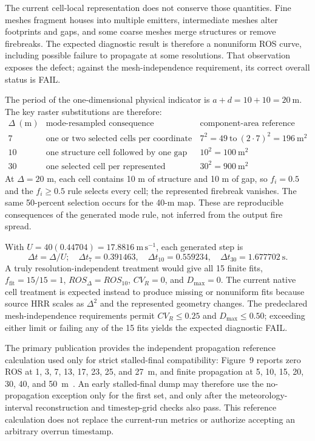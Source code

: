 The current cell-local representation does not conserve those quantities. Fine
meshes fragment houses into multiple emitters, intermediate meshes alter
footprints and gaps, and some coarse meshes merge structures or remove
firebreaks. The expected diagnostic result is therefore a nonuniform ROS curve,
including possible failure to propagate at some resolutions. That observation
exposes the defect; against the mesh-independence requirement, its correct
overall status is FAIL.

The period of the one-dimensional physical indicator is
\(a+d=10+10=20~\mathrm{m}\).  The key raster substitutions are therefore:
\[
\begin{array}{c|c|c}
\Delta~(\mathrm{m})&\text{mode-resampled consequence}&
\text{component-area reference}\\\hline
7&\text{one or two selected cells per coordinate}&
7^2=49\ \text{to}\ (2\cdot7)^2=196~\mathrm{m^2}\\
10&\text{one structure cell followed by one gap cell}&
10^2=100~\mathrm{m^2}\\
30&\text{one selected cell per represented structure}&
30^2=900~\mathrm{m^2}
\end{array}
\]
At \(\Delta=20\) m, each cell contains 10 m of structure and 10 m of gap, so
\(f_i=0.5\) and the \(f_i\geq0.5\) rule selects every cell; the represented
firebreak vanishes.  The same 50-percent selection occurs for the 40-m map.
These are reproducible consequences of the generated mode rule, not inferred
from the output fire spread.

With \(U=40(0.44704)=17.8816~\mathrm{m\,s^{-1}}\), each generated step is
\[
 \Delta t=\Delta/U;
 \quad \Delta t_7=0.391463,\quad
 \Delta t_{10}=0.559234,\quad
 \Delta t_{30}=1.677702~\mathrm{s}.
\]
A truly resolution-independent treatment would give all 15 finite fits,
\(f_{\mathrm{fit}}=15/15=1\),
\(ROS_\Delta=ROS_{10}\), \(CV_R=0\), and \(D_{\max}=0\).
The current native cell treatment is expected instead to produce missing or
nonuniform fits because source HRR scales as \(\Delta^2\) and the represented
geometry changes.  The predeclared mesh-independence requirements permit
\(CV_R\leq0.25\) and \(D_{\max}\leq0.50\); exceeding either limit or failing
any of the 15 fits yields the expected diagnostic FAIL.

The primary publication provides the independent propagation reference calculation used only
for strict stalled-final compatibility: Figure~9 reports zero ROS at 1, 3, 7,
13, 17, 23, 25, and 27~m, and finite propagation at 5, 10, 15, 20, 30, 40,
and 50~m~\cite{QinEtAl2026}.  An early stalled-final dump may therefore use
the no-propagation exception only for the first set, and only after the
meteorology-interval reconstruction and timestep-grid checks also pass.  This
reference calculation does not replace the current-run metrics or authorize accepting an
arbitrary overrun timestamp.

